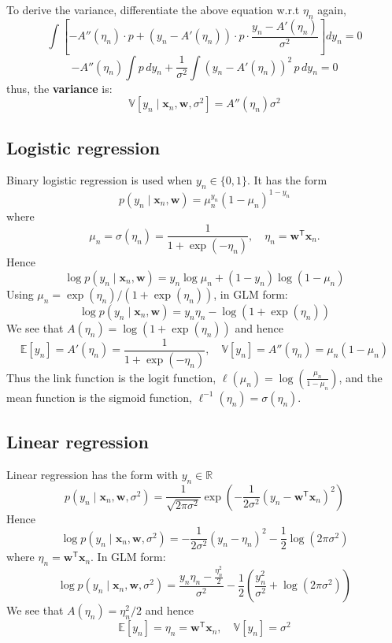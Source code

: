\documentclass[11pt]{article}
\begin{document}
To derive the variance, differentiate the above equation w.r.t $\eta_n$ again,
\[
\int \left[-A''(\eta_n)\cdot p + (y_n - A'(\eta_n)) \cdot p \cdot \frac{y_n - A'(\eta_n)}{\sigma^2}\right] dy_n = 0
\]
\[-A''(\eta_n)\int p\, dy_n + \frac{1}{\sigma^2}\int (y_n - A'(\eta_n))^2\, p\, dy_n = 0
\]
thus, the \textbf{variance} is:
\[
\mathbb{V}\left[y_n \mid \mathbf{x}_n, \mathbf{w}, \sigma^2\right]
= A''(\eta_n)\sigma^2
\]

\subsection{Logistic regression}

Binary logistic regression is used when $y_n \in \{0,1\}$. It has the form
\[
p(y_n \mid \mathbf{x}_n, \mathbf{w})
= \mu_n^{y_n}(1-\mu_n)^{1-y_n}
\]
where
\[
\mu_n = \sigma(\eta_n) = \frac{1}{1 + \exp(-\eta_n)}, \quad
\eta_n = \mathbf{w}^{\mathsf{T}}\mathbf{x}_n.
\]
Hence
\[
\log p(y_n \mid \mathbf{x}_n, \mathbf{w})
= y_n\log \mu_n + (1-y_n)\log(1-\mu_n)
\]
Using $\mu_n = \exp(\eta_n)/(1+\exp(\eta_n))$, in GLM form:
\[
\log p(y_n \mid \mathbf{x}_n, \mathbf{w})
= y_n\eta_n - \log(1 + \exp(\eta_n))
\]
We see that $A(\eta_n) = \log(1 + \exp(\eta_n))$ and hence
\[
\mathbb{E}[y_n] = A'(\eta_n) = \frac{1}{1 + \exp(-\eta_n)},\quad \mathbb{V}[y_n] = A''(\eta_n) = \mu_n(1-\mu_n)
\]
Thus the link function is the logit function, $\ell(\mu_n) = \log\left(\frac{\mu_n}{1-\mu_n}\right)$, and the mean function is the sigmoid function, $\ell^{-1}(\eta_n) = \sigma(\eta_n)$.

\subsection{Linear regression}

Linear regression has the form with $y_n \in \mathbb{R}$
\[
p(y_n \mid \mathbf{x}_n, \mathbf{w}, \sigma^2)
= \frac{1}{\sqrt{2\pi\sigma^2}}
\exp\left(-\frac{1}{2\sigma^2}(y_n - \mathbf{w}^{\mathsf{T}}\mathbf{x}_n)^2\right)
\]
Hence
\[
\log p(y_n \mid \mathbf{x}_n, \mathbf{w}, \sigma^2)
= -\frac{1}{2\sigma^2}(y_n - \eta_n)^2 - \frac{1}{2}\log(2\pi\sigma^2)
\]
where $\eta_n = \mathbf{w}^{\mathsf{T}}\mathbf{x}_n$. In GLM form:
\[
\log p(y_n \mid \mathbf{x}_n, \mathbf{w}, \sigma^2)
= \frac{y_n\eta_n - \frac{\eta_n^2}{2}}{\sigma^2}
- \frac{1}{2}\left(\frac{y_n^2}{\sigma^2} + \log(2\pi\sigma^2)\right)
\]
We see that $A(\eta_n) = \eta_n^2/2$ and hence
\[
\mathbb{E}[y_n] = \eta_n = \mathbf{w}^{\mathsf{T}}\mathbf{x}_n,\quad \mathbb{V}[y_n] = \sigma^2 
\]
\end{document}
